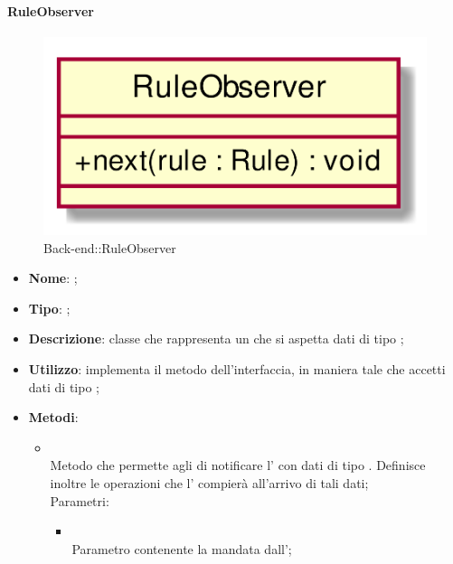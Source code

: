 \hypertarget{RuleObserver_label}{\paragraph{RuleObserver}}
\begin{figure}[h]
	\centering
	\includegraphics[width=\textwidth,height=\textheight,keepaspectratio]{images/ClassRuleObserver.png}
	\caption{Back-end::RuleObserver}
\end{figure}
\begin{itemize}
	\item \textbf{Nome}: ;
	\item \textbf{Tipo}: ;
	\item \textbf{Descrizione}: classe che rappresenta un  che si aspetta dati di tipo ;
	\item \textbf{Utilizzo}: implementa il metodo  dell'interfaccia, in maniera tale che accetti dati di tipo ;
	\item \textbf{Metodi}:
	\begin{itemize}
		\item[]  \\
		Metodo che permette agli  di notificare l' con dati di tipo . Definisce inoltre le operazioni che l' compierà all'arrivo di tali dati;\\
		Parametri:
		\begin{itemize}
			\item {} \\
			Parametro contenente la  mandata dall';
		\end{itemize}
	\end{itemize}
\end{itemize}
\FloatBarrier

